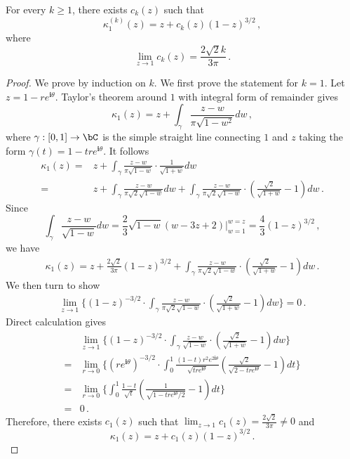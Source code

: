 \documentclass[11pt]{article}
\newcommand{\g}{\kappa_1}
\renewcommand{\i}{\mathbf{i}}
\begin{document}
\begin{lemma}\label{lem:expansion-one}
For every $k\ge 1$, there exists $c_k(z)$ such that \[\g^{(k)}(z) = z + c_k(z)(1-z)^{3/2}\,,\]
where
\[\lim_{z\to 1} c_k(z)=\frac{2\sqrt{2}k }{3\pi}\,.\]

\end{lemma}

\begin{proof}
We prove by induction on $k$. We first prove the statement for $k=1$. Let $z=1-r e^{\i\theta}$. Taylor's theorem around $1$ with integral form of remainder gives \[
\g(z) = z + \int_{\gamma} \frac{z-w}{\pi  \sqrt{1-w^2}} dw\,,
\]
where $\gamma:[0,1]\to\bC$ is the simple straight line connecting $1$ and $z$ taking the form $\gamma(t)=1-tre^{\i \theta}$. It follows
\begin{align*}
\g(z) =& z + \int_{\gamma} \frac{z-w}{\pi  \sqrt{1-w}}\cdot\frac{1}{\sqrt{1+w}} dw\\
=&z + \int_{\gamma} \frac{z-w}{\pi \sqrt{2} \sqrt{1-w}} dw+ \int_{\gamma} \frac{z-w}{\pi \sqrt{2} \sqrt{1-w}} \cdot(\frac{\sqrt{2}}{\sqrt{1+w}}-1) dw\,.
\end{align*}
Since \[\int_\gamma \frac{z-w}{\sqrt{1-w}} dw = \frac{2}{3} \sqrt{1-w} (w-3 z+2)\bigg\rvert_{w=1}^{w=z} = \frac{4}{3} (1-z)^{3/2} 
\,,
\]
we have
\begin{align*}
    \g(z) 
=z + \frac{2\sqrt{2}}{3\pi}(1-z)^{3/2}+ \int_{\gamma} \frac{z-w}{\pi \sqrt{2} \sqrt{1-w}} \cdot(\frac{\sqrt{2}}{\sqrt{1+w}}-1) dw\,.
\end{align*}
We then turn to show
\begin{align*}
    \lim_{z\to 1} \Big\{(1-z)^{-3/2}\cdot\int_{\gamma} \frac{z-w}{\pi \sqrt{2} \sqrt{1-w}} \cdot(\frac{\sqrt{2}}{\sqrt{1+w}}-1) dw\Big\}=0\,.
\end{align*}
Direct calculation gives 
\begin{align*}
    &\lim_{z\to 1} \Big\{(1-z)^{-3/2}\cdot\int_{\gamma} \frac{z-w}{ \sqrt{1-w}} \cdot(\frac{\sqrt{2}}{\sqrt{1+w}}-1) dw\Big\}\\
    ={}&\lim_{r\to 0}\Big\{(re^{\i\theta})^{-3/2}\cdot\int_0^1 \frac{(1-t)r^2 e^{2\i\theta}}{\sqrt{tre^{\i\theta}}}(\frac{\sqrt{2}}{\sqrt{2-tre^{\i\theta}}}-1)dt\Big\}\\
    ={}&\lim_{r\to 0}\Big\{\int_0^1 \frac{1-t}{\sqrt{t}}(\frac{1}{\sqrt{1-tre^{\i\theta}/2}}-1)dt\Big\}\\
    ={}& 0\,.
\end{align*}
Therefore, there exists $c_1(z)$ such that $\lim_{ z\to 1} c_1 (z) = \frac{2\sqrt{2}}{3\pi} \ne 0$ and \[
\g(z) = z + c_1(z)(1-z)^{3/2}\,.
\]


\end{proof}
\end{document}
